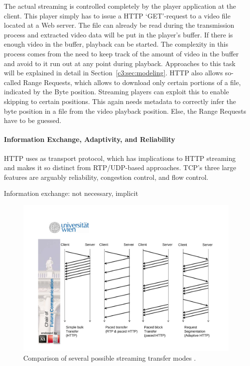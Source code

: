 The actual streaming is controlled completely by the player application at the client. This player simply has to issue a \gls{HTTP} `GET'-request to a video file located at a Web server. The file can already be read during the transmission process and extracted video data will be put in the player's buffer. If there is enough video in the buffer, playback can be started. The complexity in this process comes from the need to keep track of the amount of video in the buffer and avoid to it run out at any point during playback. Approaches to this task will be explained in detail in Section~\ref{c3:sec:modeling}. \gls{HTTP} also allows so-called Range Requests, which allows to download only certain portions of a file, indicated by the Byte position. Streaming players can exploit this to enable skipping to certain positions. This again needs metadata to correctly infer the byte position in a file from the video playback position. Else, the Range Requests have to be guessed. 

\paragraph{Information Exchange, Adaptivity, and Reliability}

\gls{HTTP} uses  as transport protocol, which has implications to \gls{HTTP} streaming and makes it so distinct from \gls{RTP}/\gls{UDP}-based approaches. \gls{TCP}'s three large features are arguably reliability, congestion control, and flow control.



 Information exchange: not necessary, implicit

\begin{figure}[htbp]
\centering
\includegraphics[width=1.0\textwidth]{images/streaming-transfer-modes.pdf}
\caption{Comparison of several possible streaming transfer modes \cite{ma2011mobile}.}
\label{c3:fig:streamingtransfermodes}
\end{figure}


